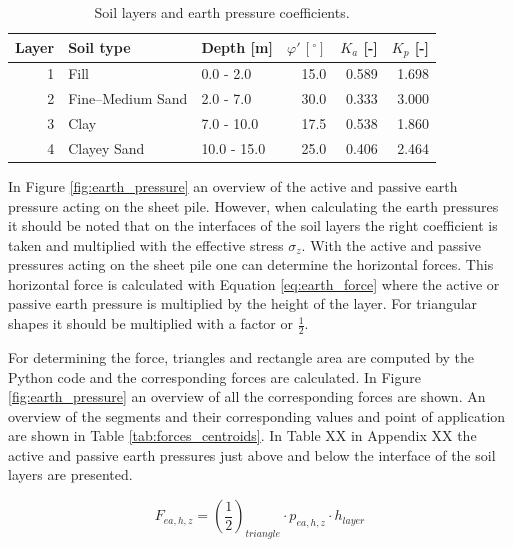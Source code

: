\begin{table}[ht]
  \centering
  \caption{Soil layers and earth pressure coefficients.}
  \label{tab:layers_ka_kp}
  \small
  \setlength{\tabcolsep}{8pt}
  \renewcommand{\arraystretch}{1.15}
  \begin{tabular}{@{}r l l r r r@{}}
    \toprule
    Layer & Soil type & Depth [m] &
    $\varphi'\,[\boldsymbol{^\circ}]$ &
    $K_{a}$ [-] & $K_{p}$ [-] \\
    \midrule
    1 & Fill             & 0.0 - 2.0   & 15.0 & 0.589 & 1.698 \\
    2 & Fine--Medium Sand& 2.0 - 7.0   & 30.0 & 0.333 & 3.000 \\
    3 & Clay             & 7.0 - 10.0  & 17.5 & 0.538 & 1.860 \\
    4 & Clayey Sand      & 10.0 - 15.0 & 25.0 & 0.406 & 2.464 \\
    \bottomrule 
  \end{tabular}
\end{table}

In Figure \ref{fig:earth_pressure} an overview of the active and passive earth pressure acting on the sheet pile. However, when calculating the earth pressures it should be noted that on the interfaces of the soil layers the right coefficient is taken and multiplied with the effective stress $\sigma_{z}$. With the active and passive pressures acting on the sheet pile one can determine the horizontal forces. This horizontal force is calculated with Equation \ref{eq:earth_force} where the active or passive earth pressure is multiplied by the height of the layer. For triangular shapes it should be multiplied with a factor or $\frac{1}{2}$.

For determining the force, triangles and rectangle area are computed by the Python code and the corresponding forces are calculated. In Figure \ref{fig:earth_pressure} an overview of all the corresponding forces are shown. An overview of the segments and their corresponding values and point of application are shown in Table \ref{tab:forces_centroids}. In Table XX in Appendix XX the active and passive earth pressures just above and below the interface of the soil layers are presented.

\begin{equation}
    F_{ea,h,z} = (\frac{1}{2})_{triangle} \cdot p_{ea,h,z} \cdot h_{layer}
    \label{eq:earth_force}
\end{equation}

